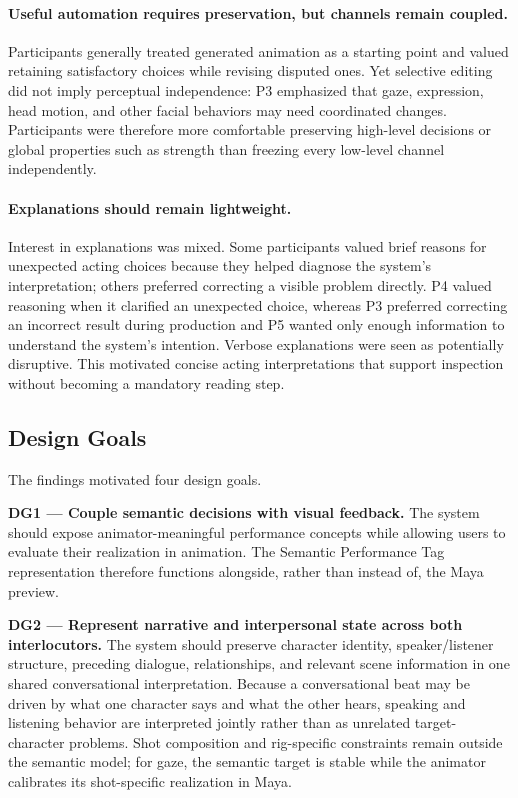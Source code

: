 \paragraph{Useful automation requires preservation, but channels remain coupled.}
Participants generally treated generated animation as a starting point and valued retaining satisfactory choices while revising disputed ones. Yet selective editing did not imply perceptual independence: P3 emphasized that gaze, expression, head motion, and other facial behaviors may need coordinated changes. Participants were therefore more comfortable preserving high-level decisions or global properties such as strength than freezing every low-level channel independently.

\paragraph{Explanations should remain lightweight.}
Interest in explanations was mixed. Some participants valued brief reasons for unexpected acting choices because they helped diagnose the system's interpretation; others preferred correcting a visible problem directly. P4 valued reasoning when it clarified an unexpected choice, whereas P3 preferred correcting an incorrect result during production and P5 wanted only enough information to understand the system's intention. Verbose explanations were seen as potentially disruptive. This motivated concise acting interpretations that support inspection without becoming a mandatory reading step.

\subsection{Design Goals}

The findings motivated four design goals.

\textbf{DG1 --- Couple semantic decisions with visual feedback.}
The system should expose animator-meaningful performance concepts while allowing users to evaluate their realization in animation. The Semantic Performance Tag representation therefore functions alongside, rather than instead of, the Maya preview.

\textbf{DG2 --- Represent narrative and interpersonal state across both interlocutors.}
The system should preserve character identity, speaker/listener structure, preceding dialogue, relationships, and relevant scene information in one shared conversational interpretation. Because a conversational beat may be driven by what one character says and what the other hears, speaking and listening behavior are interpreted jointly rather than as unrelated target-character problems. Shot composition and rig-specific constraints remain outside the semantic model; for gaze, the semantic target is stable while the animator calibrates its shot-specific realization in Maya.


